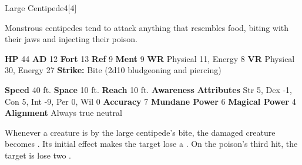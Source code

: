   \begin{monsection}{Large Centipede}{4}[4]
    \vspace{-1em}\vspace{-1em}
    \vspace{0em}

    
    Monstrous centipedes tend to attack anything that resembles food, biting with their jaws and injecting their poison.
  
    

    \begin{spellcontent}
      \begin{spelltargetinginfo}
        \pari \textbf{HP} 44 \monsep
          \textbf{AD} 12 \monsep
          \textbf{Fort} 13 \monsep
          \textbf{Ref} 9 \monsep
          \textbf{Ment} 9
        \pari \textbf{WR} Physical 11, Energy 8 \monsep
        \textbf{VR} Physical 30, Energy 27
        \pari \textbf{Strike:}
            Bite  (2d10 bludgeoning and piercing)
      \end{spelltargetinginfo}
    \end{spellcontent}
    \begin{monsterfooter}
      \pari \textbf{Speed} 40 ft. \monsep
        \textbf{Space} 10 ft. \monsep
        \textbf{Reach} 10 ft.
      \pari \textbf{Awareness} 
      \pari \textbf{Attributes}
        Str 5, Dex -1,
        Con 5, Int -9,
        Per 0, Wil 0
      \pari \textbf{Accuracy} 7 \monsep
        \textbf{Mundane Power} 6 \monsep
      \textbf{Magical Power} 4
      \pari \textbf{Alignment} Always true neutral
    \end{monsterfooter}
  \end{monsection}
    Whenever a creature is  by the large centipede's bite,
      the damaged creature becomes .
    Its initial effect makes the target lose a .
    On the poison's third hit, the target is lose two .
  
